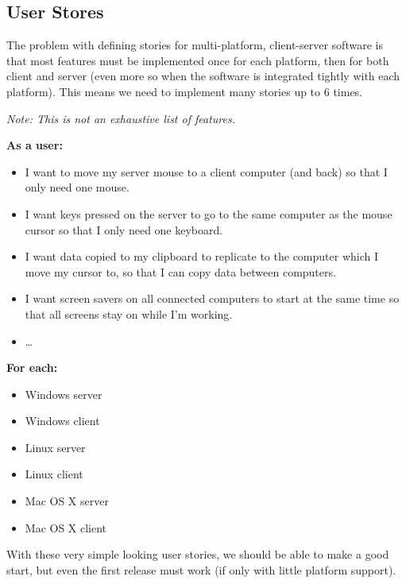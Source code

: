 \subsection{User Stores}

The problem with defining stories for multi-platform, client-server software
is that most features must be implemented once for each platform, then for both
client and server (even more so when the software is integrated tightly with
each platform). This means we need to implement many stories up to 6 times.

\textit{Note: This is not an exhaustive list of features.}

\textbf{As a user:}

\begin{itemize}
  \item I want to move my server mouse to a client computer (and back) so that 
    I only need one mouse.
  \item I want keys pressed on the server to go to the same computer as the
    mouse cursor so that I only need one keyboard.
  \item I want data copied to my clipboard to replicate to the computer which
    I move my cursor to, so that I can copy data between computers.
  \item I want screen savers on all connected computers to start at the same
    time so that all screens stay on while I'm working.
  \item \ldots
\end{itemize}

\textbf{For each:}

\begin{itemize}
  \item Windows server
  \item Windows client
  \item Linux server
  \item Linux client
  \item Mac OS X server
  \item Mac OS X client
\end{itemize}

With these very simple looking user stories, we should be able to make a good 
start, but even the first release must work (if only with little platform
support).
